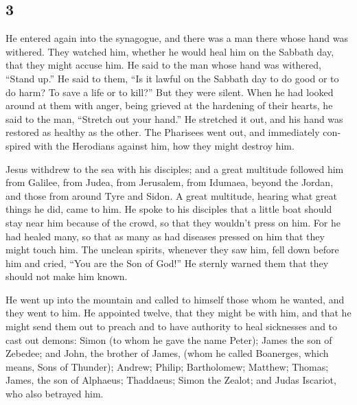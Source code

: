 \begin{paracol}{2}
\switchcolumn
\begin{otherlanguage}{english}

\hypertarget{section-5}{%
\section{3}\label{section-5}}

 He entered again into the synagogue, and there was a man
there whose hand was withered.  They watched him, whether
he would heal him on the Sabbath day, that they might accuse him.
 He said to the man whose hand was withered, ``Stand up.''
 He said to them, ``Is it lawful on the Sabbath day to do
good or to do harm? To save a life or to kill?'' But they were silent.
 When he had looked around at them with anger, being
grieved at the hardening of their hearts, he said to the man, ``Stretch
out your hand.'' He stretched it out, and his hand was restored as
healthy as the other.  The Pharisees went out, and
immediately conspired with the Herodians against him, how they might
destroy him.

 Jesus withdrew to the sea with his disciples; and a great
multitude followed him from Galilee, from Judea,  from
Jerusalem, from Idumaea, beyond the Jordan, and those from around Tyre
and Sidon. A great multitude, hearing what great things he did, came to
him.  He spoke to his disciples that a little boat should
stay near him because of the crowd, so that they wouldn't press on him.
 For he had healed many, so that as many as had diseases
pressed on him that they might touch him.  The unclean
spirits, whenever they saw him, fell down before him and cried, ``You
are the Son of God!''  He sternly warned them that they
should not make him known.

 He went up into the mountain and called to himself those
whom he wanted, and they went to him.  He appointed
twelve, that they might be with him, and that he might send them out to
preach  and to have authority to heal sicknesses and to
cast out demons:  Simon (to whom he gave the name Peter);
 James the son of Zebedee; and John, the brother of
James, (whom he called Boanerges, which means, Sons of Thunder);
 Andrew; Philip; Bartholomew; Matthew; Thomas; James, the
son of Alphaeus; Thaddaeus; Simon the Zealot;  and Judas
Iscariot, who also betrayed him.


\end{otherlanguage}
\end{paracol}
